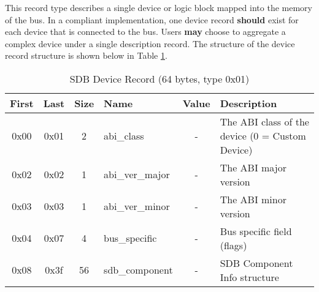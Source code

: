 \documentclass[a4paper, 12pt]{article}
\begin{document}
This record type describes a single device or logic block mapped into the memory of the
bus. In a compliant implementation, one device record \textbf{should} exist for each device that is
connected to the bus. Users \textbf{may} choose to aggregate a complex device under a single
description record. The structure of the device record structure is shown below in Table
\ref{sdb_device}.

\begin{center}
  \begin{savenotes}
    \begin{table}[!ht]\footnotesize
      \caption{SDB Device Record (64 bytes, type 0x01)}\label{sdb_device}\centering
        \begin{tabular}{| c | c | c | l | c | p{5cm} |} \hline
        First & Last & Size & Name & Value & Description \\ \hline
        0x00 & 0x01 & 2 & abi\_class & - & The ABI class of the device (0 = Custom Device) \\ \hline
        0x02 & 0x02 & 1 & abi\_ver\_major & - & The ABI major version \\ \hline
        0x03 & 0x03 & 1 & abi\_ver\_minor & - & The ABI minor version \\ \hline
        0x04 & 0x07 & 4 & bus\_specific & - & Bus specific field (flags) \\ \hline
        0x08 & 0x3f & 56 & sdb\_component & - & SDB Component Info structure \\ \hline
        \end{tabular}
    \end{table}
  \end{savenotes}
\end{center}
\end{document}
